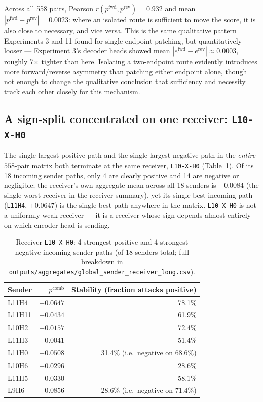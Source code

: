 \documentclass[11pt]{article}
\newcommand{\fwd}{\ensuremath{e^{\mathrm{fwd}}}}
\newcommand{\rev}{\ensuremath{e^{\mathrm{rev}}}}
\newcommand{\pfwd}{\ensuremath{p^{\mathrm{fwd}}}}
\newcommand{\prev}{\ensuremath{p^{\mathrm{rev}}}}
\newcommand{\pcomb}{\ensuremath{p^{\mathrm{comb}}}}
\begin{document}
Across all 558 pairs, Pearson $r(\pfwd, \prev) = 0.932$ and mean
$|\pfwd - \prev| = 0.0023$: where an isolated route is sufficient to move the
score, it is also close to necessary, and vice versa. This is the same
qualitative pattern Experiments 3 and 11 found for single-endpoint patching,
but quantitatively looser — Experiment 3's decoder heads showed mean
$|\fwd-\rev| \approx 0.0003$, roughly 7$\times$ tighter than here. Isolating a
two-endpoint route evidently introduces more forward/reverse asymmetry than
patching either endpoint alone, though not enough to change the qualitative
conclusion that sufficiency and necessity track each other closely for this
mechanism.

\subsection{A sign-split concentrated on one receiver: \texttt{L10-X-H0}}
\label{sec:split}

The single largest positive path and the single largest negative path in the
\emph{entire} $558$-pair matrix both terminate at the same receiver,
\texttt{L10-X-H0} (Table~\ref{tab:l10x0}). Of its 18 incoming sender paths,
only 4 are clearly positive and 14 are negative or negligible; the receiver's
own aggregate mean across all 18 senders is $-0.0084$ (the single worst
receiver in the receiver summary), yet its single best incoming path
(\texttt{L11H4}, $+0.0647$) is the single best path anywhere in the matrix.
\texttt{L10-X-H0} is not a uniformly weak receiver — it is a receiver whose
sign depends almost entirely on which encoder head is sending.

\begin{table}[H]
\centering
\caption{Receiver \texttt{L10-X-H0}: 4 strongest positive and 4 strongest
negative incoming sender paths (of 18 senders total; full breakdown in
\texttt{outputs/aggregates/global\_sender\_receiver\_long.csv}).}
\label{tab:l10x0}
\begin{tabular}{lrr}
\toprule
Sender & $\pcomb$ & Stability (fraction attacks positive) \\
\midrule
L11H4  & $+0.0647$ & 78.1\% \\
L11H11 & $+0.0434$ & 61.9\% \\
L10H2  & $+0.0157$ & 72.4\% \\
L11H3  & $+0.0041$ & 51.4\% \\
\midrule
L11H0  & $-0.0508$ & 31.4\% (i.e.\ negative on 68.6\%) \\
L10H6  & $-0.0296$ & 28.6\% \\
L11H5  & $-0.0330$ & 58.1\% \\
L9H6   & $-0.0856$ & 28.6\% (i.e.\ negative on 71.4\%) \\
\bottomrule
\end{tabular}
\end{table}
\end{document}
